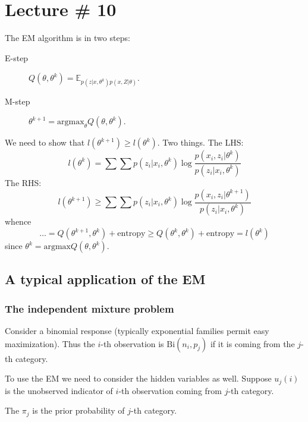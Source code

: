\documentclass[a4paper]{article}
\newcommand{\brac}[1]{{\left ( #1 \right )}}
\newcommand{\Ex}[0]{{\mathbb{E}}}
\begin{document}




\section{Lecture \# 10} %
\label{sec:lecture_10}

The EM algorithm is in two steps: \begin{description}
	\item[E-step] $Q\brac{\theta, \theta^k} = \Ex_{p(z\lvert x, \theta^k) p(x,Z\lvert \theta)}$.
	\item[M-step] $\theta^{k+1}=\text{argmax}_{\theta} Q\brac{\theta, \theta^k}$.
\end{description}

We need to show that $l(\theta^{k+1})\geq l(\theta^k)$. Two things. The LHS:
\[l(\theta^k) = \sum \sum p(z_i\lvert x_i,\theta^k) \log\frac{p(x_i,z_i\lvert\theta^k)}{p(z_i\lvert x_i,\theta^k)}\]
The RHS:
\[l(\theta^{k+1}) \geq \sum \sum p(z_i\lvert x_i,\theta^k) \log\frac{p(x_i,z_i\lvert\theta^{k+1})}{p(z_i\lvert x_i,\theta^k)}\]
whence 
\[\ldots = Q(\theta^{k+1}, \theta^k) + \text{entropy}\geq Q(\theta^k, \theta^k) + \text{entropy} = l(\theta^k)\]
since $\theta^k = \text{argmax}Q(\theta, \theta^k)$.

\subsection{A typical application of the EM} %
\label{sub:a_typical_application_of_the_em}

\subsubsection{The independent mixture problem} %
\label{ssub:the_independent_mixture_problem}
Consider a binomial response (typically exponential families permit easy maximization). 
Thus the $i$-th observation is $\text{Bi}(n_i, p_j)$ if it is coming from the $j$-th category.

To use the EM we need to consider the hidden variables as well. Suppose $u_j(i)$ is the unobserved
indicator of $i$-th observation coming from $j$-th category.

The $\pi_j$ is the prior probability of $j$-th category.
\end{document}
